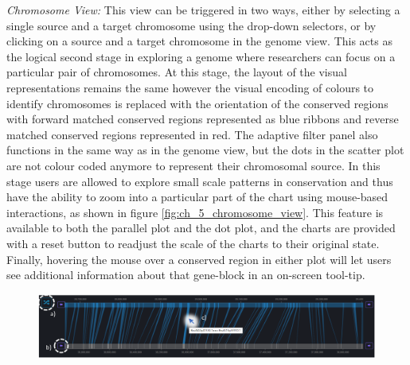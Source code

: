 \textit{Chromosome View:} This view can be triggered in two ways, either by selecting a single source and a target chromosome using the drop-down selectors, or by clicking on a source and a target chromosome in the genome view. This acts as the logical second stage in exploring a genome where researchers can focus on a particular pair of chromosomes. At this stage, the layout of the visual representations remains the same however the visual encoding of colours to identify chromosomes is replaced with the orientation of the conserved regions with forward matched conserved regions represented as blue ribbons and reverse matched conserved regions represented in red. The adaptive filter panel also functions in the same way as in the genome view, but the dots in the scatter plot are not colour coded anymore to represent their chromosomal source. In this stage users are allowed to explore small scale patterns in conservation and thus have the ability to zoom into a particular part of the chart using mouse-based interactions, as shown in figure \ref{fig:ch_5_chromosome_view}. This feature is available to both the parallel plot and the dot plot, and the charts are provided with a reset button to readjust the scale of the charts to their original state. Finally, hovering the mouse over a conserved region in either plot will let users see additional information about that gene-block in an on-screen tool-tip.



\begin{figure}[h]
  \centering
  \includegraphics[width=1\linewidth]{images/ch_5_block_view.PNG}
  \label{fig:ch_5_block_view}
\end{figure} 

